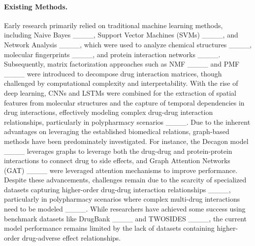 \paragraph{Existing Methods.} 
Early research primarily relied on traditional machine learning methods, including Naive Bayes ____, Support Vector Machines (SVMs) ____, and Network Analysis ____, which were used to analyze chemical structures ____, molecular fingerprints ____, and protein interaction networks ____. Subsequently, matrix factorization approaches such as NMF ____ and PMF ____ were introduced to decompose drug interaction matrices, though challenged by computational complexity and interpretability. With the rise of deep learning, CNNs and LSTMs were combined for the extraction of spatial features from molecular structures and the capture of temporal dependencies in drug interactions, effectively modeling complex drug-drug interaction relationships, particularly in polypharmacy scenarios ____. Due to the inherent advantages on leveraging the established biomedical relations, graph-based methods have been predominately investigated. For instance, the Decagon model ____ leverages graphs to leverage both the drug-drug and protein-protein interactions to connect drug to side effects, and Graph Attention Networks (GAT) ____ were leveraged attention mechanisms to improve performance. Despite these advancements, challenges remain due to the scarcity of specialized datasets capturing higher-order drug-drug interaction relationships ____, particularly in polypharmacy scenarios where complex multi-drug interactions need to be modeled ____. While researchers have achieved some success using benchmark datasets like DrugBank ____ and TWOSIDES ____, the current model performance remains limited by the lack of datasets containing higher-order drug-adverse effect relationships.



